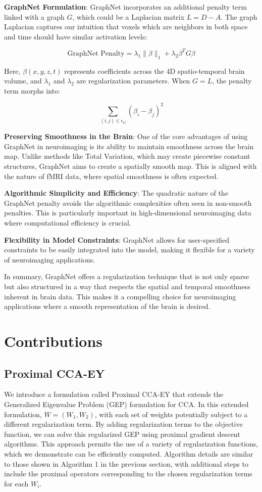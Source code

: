 \textbf{GraphNet Formulation}: GraphNet incorporates an additional penalty term linked with a graph \(G\), which could be a Laplacian matrix \(L = D - A\).
The graph Laplacian captures our intuition that voxels which are neighbors in both space and time should have similar activation levels:

\[
\text{GraphNet Penalty} = \lambda_{1} \lVert \beta \rVert_{1} + \lambda_{2} \beta^T G \beta
\]

Here, \(\beta(x, y, z, t)\) represents coefficients across the 4D spatio-temporal brain volume, and \(\lambda_{1}\) and \(\lambda_{2}\) are regularization parameters. When \(G = L\), the penalty term morphs into:

\[
\sum_{(i, j) \in \epsilon_{G}} (\beta_{i} - \beta_{j})^{2}
\]

\textbf{Preserving Smoothness in the Brain}: One of the core advantages of using GraphNet in neuroimaging is its ability to maintain smoothness across the brain map.
Unlike methods like Total Variation, which may create piecewise constant structures, GraphNet aims to create a spatially smooth map.
This is aligned with the nature of fMRI data, where spatial smoothness is often expected.

\textbf{Algorithmic Simplicity and Efficiency}: The quadratic nature of the GraphNet penalty avoids the algorithmic complexities often seen in non-smooth penalties.
This is particularly important in high-dimensional neuroimaging data where computational efficiency is crucial.

\textbf{Flexibility in Model Constraints}: GraphNet allows for user-specified constraints to be easily integrated into the model, making it flexible for a variety of neuroimaging applications.

In summary, GraphNet offers a regularization technique that is not only sparse but also structured in a way that respects the spatial and temporal smoothness inherent in brain data.
This makes it a compelling choice for neuroimaging applications where a smooth representation of the brain is desired.


\section{Contributions}
\subsection{Proximal CCA-EY}
We introduce a formulation called Proximal CCA-EY that extends the Generalized Eigenvalue Problem (GEP) formulation for CCA. In this extended formulation, \( W = (W_1, W_2) \), with each set of weights potentially subject to a different regularization term.
By adding regularization terms to the objective function, we can solve this regularized GEP using proximal gradient descent algorithms.
This approach permits the use of a variety of regularization functions, which we demonstrate can be efficiently computed.
Algorithm details are similar to those shown in Algorithm 1 in the previous section, with additional steps to include the proximal operators corresponding to the chosen regularization terms for each \( W_i \).

